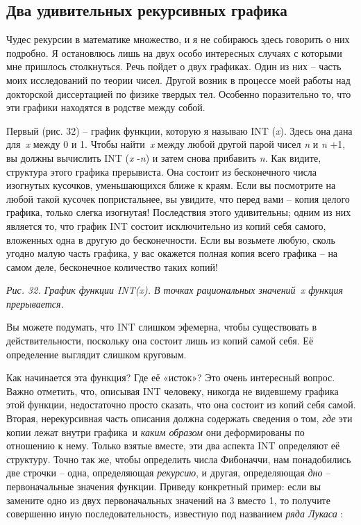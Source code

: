\documentclass[../main.tex]{subfiles}
\begin{document}
\subsection{Два удивительных рекурсивных графика}

Чудес рекурсии в математике множество, и я не собираюсь здесь говорить о них подробно. Я остановлюсь лишь на двух особо интересных случаях с которыми мне пришлось столкнуться. Речь пойдет о двух графиках. Один из них \--- часть моих исследований по теории чисел. Другой возник в процессе моей работы над докторской диссертацией по физике твердых тел. Особенно поразительно то, что эти графики находятся в родстве между собой.

Первый (рис. 32) \--- график функции, которую я называю INT (\emph{x}). Здесь она дана для~\emph{x} между 0 и 1. Чтобы найти~\emph{x} между любой другой парой чисел \emph{n} и \emph{n} +1, вы должны вычислить INT (\emph{x} -\emph{n}) и затем снова прибавить \emph{n}. Как видите, структура этого графика прерывиста. Она состоит из бесконечного числа изогнутых кусочков, уменьшающихся ближе к краям. Если вы посмотрите на любой такой кусочек попристальнее, вы увидите, что перед вами \--- копия целого графика, только слегка изогнутая! Последствия этого удивительны; одним из них является то, что график INT состоит исключительно из копий себя самого, вложенных одна в другую до бесконечности. Если вы возьмете любую, сколь угодно малую часть графика, у вас окажется полная копия всего графика \--- на самом деле, бесконечное количество таких копий!

\emph{Рис. 32. График функции INT(x). В точках рациональных значений~x функция прерывается.}

Вы можете подумать, что INT слишком эфемерна, чтобы существовать в действительности, поскольку она состоит лишь из копий самой себя. Её определение выглядит слишком круговым.

Как начинается эта функция? Где её «исток»? Это очень интересный вопрос. Важно отметить, что, описывая INT человеку, никогда не видевшему графика этой функции, недостаточно просто сказать, что она состоит из копий себя самой. Вторая, нерекурсивная часть описания должна содержать сведения о том, \emph{где} эти копии лежат внутри графика~и \emph{каким образом} они деформированы по отношению к нему. Только взятые вместе, эти два аспекта INT определяют её структуру. Точно так же, чтобы определить числа Фибоначчи, нам понадобились две строчки \--- одна, определяющая \emph{рекурсию}, и другая, определяющая \emph{дно} \--- первоначальные значения функции. Приведу конкретный пример: если вы замените одно из двух первоначальных значений на 3 вместо 1, то получите совершенно иную последовательность, известную под названием \emph{ряда Лукаса} :
\end{document}
